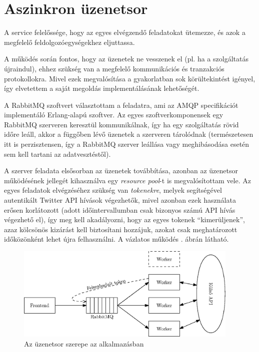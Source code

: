 \section{Aszinkron üzenetsor}

A service felelőssége, hogy az egyes elvégzendő feladatokat ütemezze,
és azok a megfelelő feldolgozóegységekhez eljuttassa.

A működés során fontos, hogy az üzenetek ne vesszenek el (pl. ha a
szolgáltatás újraindul), ehhez szükség van a megfelelő kommunikációs és
tranzakciós protokollokra. Mivel ezek megvalósítása a gyakorlatban sok
körültekintést igényel, így elvetettem a saját megoldás implementálásának
lehetőségét.

A RabbitMQ szoftvert választottam a feladatra, ami az AMQP specifikációt
implementáló Erlang-alapú szoftver. Az egyes szoftverkomponensek egy RabbitMQ
szerveren keresztül kommunikálnak, így ha egy szolgáltatás rövid időre leáll,
akkor a függőben lévő üzenetek a szerveren tárolódnak (természetesen itt is
perzisztensen, így a RabbitMQ szerver leállása vagy meghibásodása esetén sem
kell tartani az adatvesztéstől).

A szerver feladata elsősorban az üzenetek továbbítása, azonban az üzenetsor
működésének jellegét kihasználva egy \emph{resource pool}-t is megvalósítottam
vele. Az egyes feladatok elvégzéséhez szükség van \emph{tokenekre}, melyek
segítségével autentikált Twitter API hívások végezhetők, mivel azonban ezek
használata erősen korlátozott (adott időintervallumban csak bizonyos számú
API hívás végezhető el), így meg kell akadályozni, hogy az egyes tokenek
``kimerüljenek'', azaz kölcsönös kizárást kell biztosítani hozzájuk,
azokat csak meghatározott időközönként lehet újra felhasználni.
A vázlatos működés . ábrán látható.

\begin{figure}[h!]
  \centering
  \includegraphics[width=0.95\textwidth]{figures/queue}
  \caption{Az üzenetsor szerepe az alkalmazásban}
  \label{fig:queue}
\end{figure}

